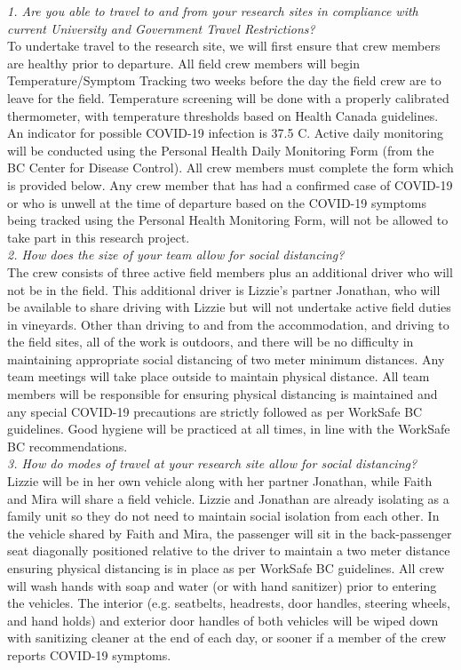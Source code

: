 \documentclass[11pt,letter]{article}
\begin{document}
\emph{1. Are you able to travel to and from your research sites in compliance with current University and Government Travel Restrictions?}\\
To undertake travel to the research site, we will first ensure that crew members are healthy prior to departure. All field crew members will begin Temperature/Symptom Tracking two weeks before the day the field crew are to leave for the field. Temperature screening will be done with a properly calibrated thermometer, with temperature thresholds based on Health Canada guidelines. An indicator for possible COVID-19 infection is 37.5 C. Active daily monitoring will be conducted using the Personal Health Daily Monitoring Form (from the BC Center for Disease Control). All crew members must complete the form which is provided below. Any crew member that has had a confirmed case of COVID-19 or who is unwell at the time of departure based on the COVID-19 symptoms being tracked using the Personal Health Monitoring Form, will not be allowed to take part in this research project.\\
   
\emph{2. How does the size of your team allow for social distancing?}\\
The crew consists of three active field members plus an additional driver who will not be in the field. This additional driver is Lizzie's partner Jonathan, who will be available to share driving with Lizzie but will not undertake active field duties in vineyards. Other than driving to and from the accommodation, and driving to the field sites, all of the work is outdoors, and there will be no difficulty in maintaining appropriate social distancing of two meter minimum distances. Any team meetings will take place outside to maintain physical distance. All team members will be responsible for ensuring physical distancing is maintained and any special COVID-19 precautions are strictly followed as per WorkSafe BC guidelines. Good hygiene will be practiced at all times, in line with the WorkSafe BC recommendations. \\

\emph{3. How do modes of travel at your research site allow for social distancing?}\\
Lizzie will be in her own vehicle along with her partner Jonathan, while Faith and Mira will share a field vehicle. Lizzie and Jonathan are already isolating as a family unit so they do not need to maintain social isolation from each other. In the vehicle shared by Faith and Mira, the passenger will sit in the back-passenger seat diagonally positioned relative to the driver to maintain a two meter distance ensuring physical distancing is in place as per WorkSafe BC guidelines. All crew will wash hands with soap and water (or with hand sanitizer) prior to entering the vehicles. The interior (e.g. seatbelts, headrests, door handles, steering wheels, and hand holds) and exterior door handles of both vehicles will be wiped down with sanitizing cleaner at the end of each day, or sooner if a member of the crew reports COVID-19 symptoms.\\  
\end{document}

